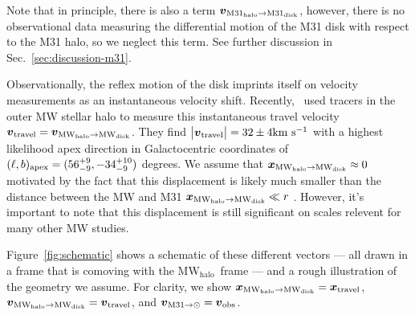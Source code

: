 \documentclass[twocolumn]{aastex631}
\newcommand{\bov}{\ensuremath{\boldsymbol{v}}}
\newcommand{\boldx}{\ensuremath{\boldsymbol{x}}}
\newcommand{\vtrav}{\ensuremath{\bov_{\rm travel}}}
\newcommand{\xtrav}{\ensuremath{\boldx_{\rm travel}}}
\newcommand{\pos}[2]{\ensuremath{\boldx_{\rm #1 \to #2}}}
\newcommand{\vel}[2]{\ensuremath{\bov_{\rm #1 \to #2}}}
\newcommand{\mwouter}{\ensuremath{\textrm{MW}_\textrm{halo}}}
\newcommand{\mwdisk}{\ensuremath{\textrm{MW}_\textrm{disk}}}
\begin{document}
Note that in principle, there is also a term 
$\vel{\rm M31_{halo}}{\rm M31_{disk}}$, 
however, there is no observational data measuring the differential motion of the
M31 disk with respect to the M31 halo, so we neglect this term.
See further discussion in Sec.~\ref{sec:discussion-m31}.


Observationally, the reflex motion of the disk imprints itself on velocity
measurements as an instantaneous velocity shift.
Recently,~\cite{Petersen2021} used tracers in the outer MW stellar halo to 
measure this instantaneous travel velocity
$\vtrav=\vel{\mwouter}{\mwdisk}$.
They find $\big|\vtrav\big|=32\pm4\kms$ with a highest likelihood apex 
direction in Galactocentric coordinates of
$(\ell, b)_{\rm apex} = (56^{+9}_{-9},-34^{+10}_{-9})$ degrees. 
We assume that $\pos{\mwouter}{\mwdisk} \approx 0$ motivated by the fact
that this displacement is likely much smaller than the distance between the MW
and M31 $\pos{\mwouter}{\mwdisk} \ll r$ \citep[as expected from simulations,
e.g.,][]{Garavito-Camargo2021b}.
However, it's important to note that this displacement is still significant on
scales relevent for many other MW studies. 

Figure~\ref{fig:schematic} shows a schematic of these different vectors --- all
drawn in a frame that is comoving with the \mwouter\ frame --- and a rough
illustration of the geometry we assume. For clarity, we show 
$\pos{\mwouter}{\mwdisk}= \xtrav$, $\vel{\mwouter}{\mwdisk}=\vtrav$, and
$\vel{M31}{\odot}=\bov_{\rm obs}$.
\end{document}
